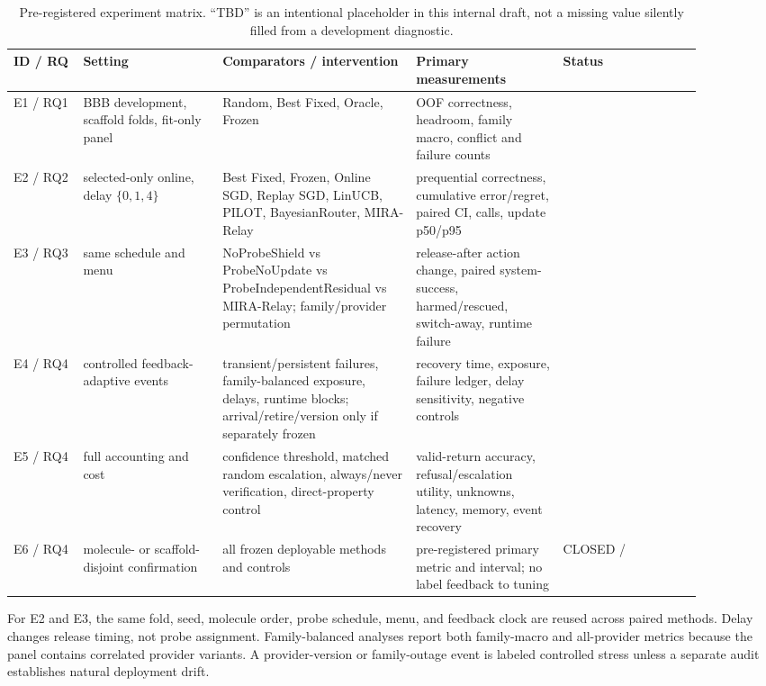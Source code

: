 \documentclass[sigconf,anonymous]{aamas}
\newcommand{\tbd}{\text{TBD}}
\begin{document}
\begin{table}[t]
\caption{Pre-registered experiment matrix. ``TBD'' is an intentional placeholder in this internal draft, not a missing value silently filled from a development diagnostic.}
\label{tab:matrix}
\small
\begin{tabular}{p{0.09\linewidth}p{0.18\linewidth}p{0.25\linewidth}p{0.19\linewidth}p{0.18\linewidth}}
\toprule
ID / RQ & Setting & Comparators / intervention & Primary measurements & Status \\
\midrule
E1 / RQ1 & BBB development, scaffold folds, fit-only panel & Random, Best Fixed, Oracle, Frozen & OOF correctness, headroom, family macro, conflict and failure counts & \tbd{} \\
E2 / RQ2 & selected-only online, delay $\{0,1,4\}$ & Best Fixed, Frozen, Online SGD, Replay SGD, LinUCB, PILOT, BayesianRouter, MIRA-Relay & prequential correctness, cumulative error/regret, paired CI, calls, update p50/p95 & \tbd{} \\
E3 / RQ3 & same schedule and menu & NoProbeShield vs ProbeNoUpdate vs ProbeIndependentResidual vs MIRA-Relay; family/provider permutation & release-after action change, paired system-success, harmed/rescued, switch-away, runtime failure & \tbd{} \\
E4 / RQ4 & controlled feedback-adaptive events & transient/persistent failures, family-balanced exposure, delays, runtime blocks; arrival/retire/version only if separately frozen & recovery time, exposure, failure ledger, delay sensitivity, negative controls & \tbd{} \\
E5 / RQ4 & full accounting and cost & confidence threshold, matched random escalation, always/never verification, direct-property control & valid-return accuracy, refusal/escalation utility, unknowns, latency, memory, event recovery & \tbd{} \\
E6 / RQ4 & molecule- or scaffold-disjoint confirmation & all frozen deployable methods and controls & pre-registered primary metric and interval; no label feedback to tuning & CLOSED / \tbd{} \\
\bottomrule
\end{tabular}
\end{table}

For E2 and E3, the same fold, seed, molecule order, probe schedule, menu, and feedback clock are reused across paired methods. Delay changes release timing, not probe assignment. Family-balanced analyses report both family-macro and all-provider metrics because the panel contains correlated provider variants. A provider-version or family-outage event is labeled controlled stress unless a separate audit establishes natural deployment drift.
\end{document}
